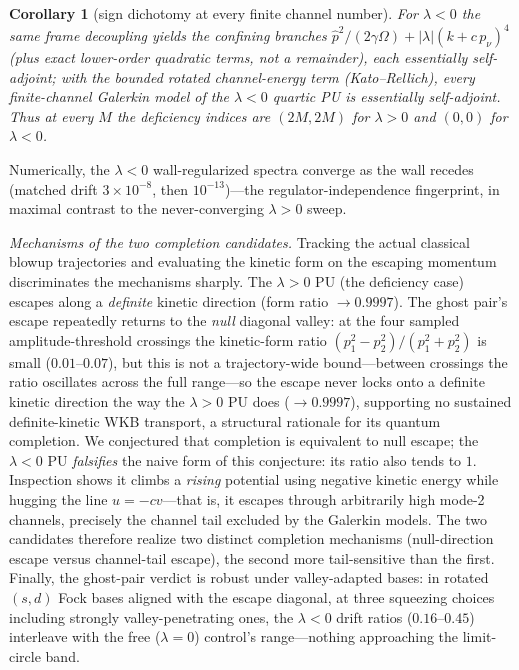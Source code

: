 \documentclass[11pt]{article}
\newtheorem{corollary}[theorem]{Corollary}
\theoremstyle{definition}
\theoremstyle{remark}
\begin{document}
\begin{corollary}[sign dichotomy at every finite channel number]
\label{cor:dichotomy}
For $\lambda<0$ the same frame decoupling yields the confining branches
$\hat p^{2}/(2\gamma\Omega)+|\lambda|(k+c\,p_\nu)^{4}$ (plus exact
lower-order quadratic terms, not a remainder), each
essentially self-adjoint; with the bounded rotated channel-energy term
(Kato--Rellich), every finite-channel Galerkin model of the $\lambda<0$
quartic PU is essentially self-adjoint. Thus at every $M$ the deficiency
indices are $(2M,2M)$ for $\lambda>0$ and $(0,0)$ for $\lambda<0$.
\end{corollary}

Numerically, the $\lambda<0$ wall-regularized spectra converge as the
wall recedes (matched drift $3\times10^{-8}$, then $10^{-13}$)---the
regulator-independence fingerprint, in maximal contrast to the
never-converging $\lambda>0$ sweep.

\emph{Mechanisms of the two completion candidates.} Tracking the actual
classical blowup trajectories and evaluating the kinetic form on the
escaping momentum discriminates the mechanisms sharply. The $\lambda>0$
PU (the deficiency case) escapes along a \emph{definite} kinetic
direction (form ratio $\to 0.9997$). The ghost pair's escape repeatedly returns to the
\emph{null} diagonal valley: at the four sampled amplitude-threshold
crossings the kinetic-form ratio $(p_1^{2}-p_2^{2})/(p_1^{2}+p_2^{2})$ is
small ($0.01$--$0.07$), but this is not a trajectory-wide bound---between
crossings the ratio oscillates across the full range---so the escape
never locks onto a definite kinetic direction the way the $\lambda>0$ PU
does ($\to0.9997$), supporting no sustained definite-kinetic WKB
transport, a structural rationale for its quantum completion. We conjectured that completion is equivalent to null escape;
the $\lambda<0$ PU \emph{falsifies} the naive form of this conjecture:
its ratio also tends to $1$. Inspection shows it climbs a \emph{rising}
potential using negative kinetic energy while hugging the line
$u=-cv$---that is, it escapes through arbitrarily high mode-2 channels,
precisely the channel tail excluded by the Galerkin models. The two
candidates therefore realize two distinct completion mechanisms
(null-direction escape versus channel-tail escape), the second more
tail-sensitive than the first. Finally, the ghost-pair verdict is robust
under valley-adapted bases: in rotated $(s,d)$ Fock bases aligned with
the escape diagonal, at three squeezing choices including strongly
valley-penetrating ones, the $\lambda<0$ drift ratios ($0.16$--$0.45$)
interleave with the free ($\lambda=0$) control's range---nothing
approaching the limit-circle band.
\end{document}
